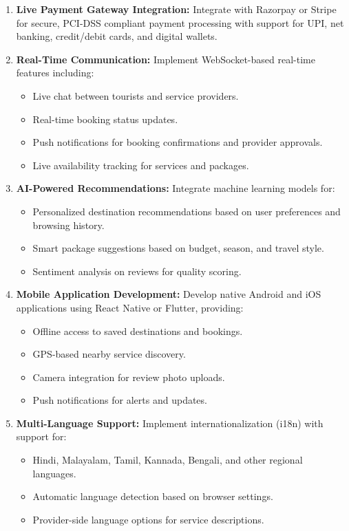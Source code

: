 \begin{enumerate}[leftmargin=2em]
    \item \textbf{Live Payment Gateway Integration:} Integrate with Razorpay or Stripe for secure, PCI-DSS compliant payment processing with support for UPI, net banking, credit/debit cards, and digital wallets.

    \item \textbf{Real-Time Communication:} Implement WebSocket-based real-time features including:
    \begin{itemize}
        \item Live chat between tourists and service providers.
        \item Real-time booking status updates.
        \item Push notifications for booking confirmations and provider approvals.
        \item Live availability tracking for services and packages.
    \end{itemize}

    \item \textbf{AI-Powered Recommendations:} Integrate machine learning models for:
    \begin{itemize}
        \item Personalized destination recommendations based on user preferences and browsing history.
        \item Smart package suggestions based on budget, season, and travel style.
        \item Sentiment analysis on reviews for quality scoring.
    \end{itemize}

    \item \textbf{Mobile Application Development:} Develop native Android and iOS applications using React Native or Flutter, providing:
    \begin{itemize}
        \item Offline access to saved destinations and bookings.
        \item GPS-based nearby service discovery.
        \item Camera integration for review photo uploads.
        \item Push notifications for alerts and updates.
    \end{itemize}

    \item \textbf{Multi-Language Support:} Implement internationalization (i18n) with support for:
    \begin{itemize}
        \item Hindi, Malayalam, Tamil, Kannada, Bengali, and other regional languages.
        \item Automatic language detection based on browser settings.
        \item Provider-side language options for service descriptions.
    \end{itemize}


\end{enumerate}
